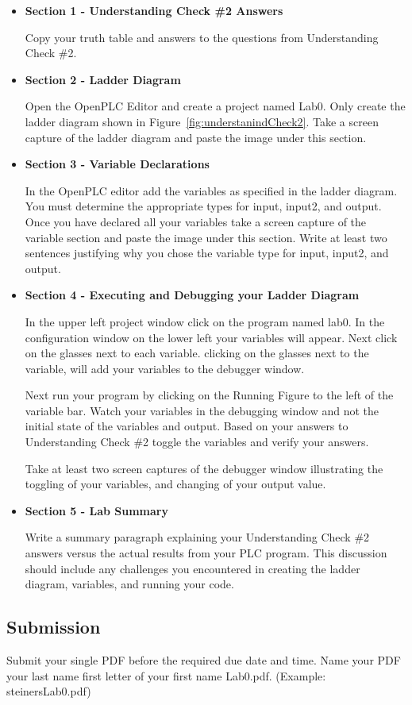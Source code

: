 \begin{itemize}[listparindent=1.5em]
    \item \textbf{Section 1 - Understanding Check \#2 Answers}
        
        Copy your truth table and answers to the questions from Understanding Check \#2.
    
    \item \textbf{Section 2 - Ladder Diagram}
        
        Open the OpenPLC Editor and create a project named Lab0. Only create the ladder diagram shown in  Figure~\ref{fig:understanindCheck2}. Take a screen capture of the ladder diagram and paste the image under this section.
    
    \item \textbf{Section 3 - Variable Declarations}
        
        In the OpenPLC editor add the variables as specified in the ladder diagram.  You must determine the appropriate types for input, input2, and output. Once you have declared all your variables take a screen capture of the variable section and paste the image under this section. Write at least two sentences justifying why you chose the variable type for input, input2, and output.
    
     \item \textbf{Section 4 - Executing and Debugging your Ladder Diagram}
        
        In the upper left project window click on the program named lab0. In the configuration window on the lower left your variables will appear.  Next click on the glasses next to each variable. clicking on the glasses next to the variable, will add your variables to the debugger window. 
     
        Next run your program by clicking on the Running Figure to the left of the variable bar. Watch your variables in the debugging window and not the initial state of the variables and output. Based on your answers to Understanding Check \#2 toggle the variables and verify your answers.
        
        Take at least two screen captures of the debugger window illustrating the toggling of your variables, and changing of your output value.
     
     \item \textbf{Section 5 - Lab Summary}
     
        Write a summary paragraph explaining your Understanding Check \#2 answers versus the actual results from your PLC program.  This discussion should include any challenges you encountered in creating the ladder diagram, variables, and running your code. 
     
\end{itemize}

\subsection{Submission}
Submit your single PDF before the required due date and time. Name your PDF your last name first letter of your first name Lab0.pdf. (Example: steinersLab0.pdf)
